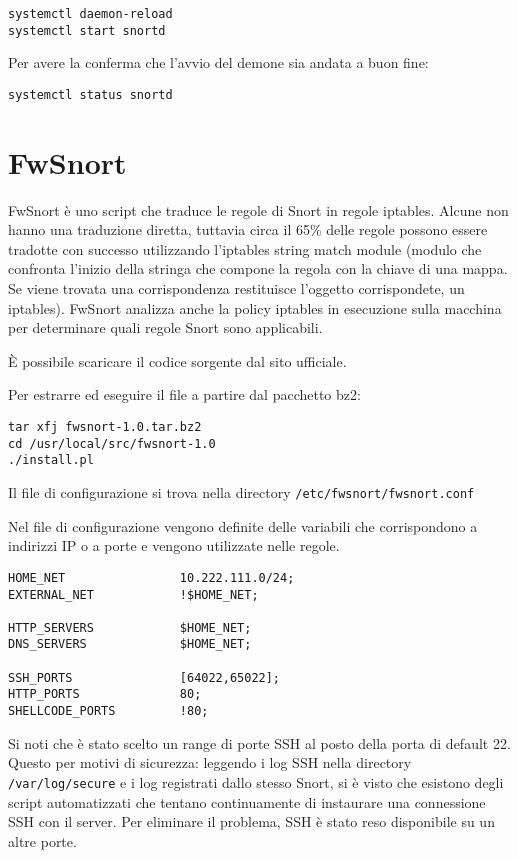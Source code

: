 \begin{verbatim}
systemctl daemon-reload
systemctl start snortd
\end{verbatim}

Per avere la conferma che l'avvio del demone sia andata a buon fine:

\begin{verbatim}
systemctl status snortd
\end{verbatim}

\section{FwSnort}

FwSnort è uno script che traduce le regole di Snort in regole iptables. Alcune non hanno una traduzione diretta, tuttavia circa il 65\% delle regole possono essere tradotte con successo utilizzando l'iptables string match module (modulo che confronta l'inizio della stringa che compone la regola con la chiave di una mappa. Se viene trovata una corrispondenza restituisce l'oggetto corrispondete, un iptables). FwSnort analizza anche la policy iptables in esecuzione sulla macchina per determinare quali regole Snort sono applicabili.

È possibile scaricare il codice sorgente dal sito ufficiale.

Per estrarre ed eseguire il file a partire dal pacchetto bz2:

\begin{verbatim}
tar xfj fwsnort-1.0.tar.bz2
cd /usr/local/src/fwsnort-1.0 
./install.pl
\end{verbatim}

Il file di configurazione si trova nella directory \texttt{/etc/fwsnort/fwsnort.conf}

Nel file di configurazione vengono definite delle variabili che corrispondono a indirizzi IP o a porte e vengono utilizzate nelle regole.

\begin{verbatim}
HOME_NET                10.222.111.0/24;
EXTERNAL_NET            !$HOME_NET;

HTTP_SERVERS            $HOME_NET;
DNS_SERVERS             $HOME_NET;

SSH_PORTS               [64022,65022];
HTTP_PORTS              80;
SHELLCODE_PORTS         !80;
\end{verbatim}

Si noti che è stato scelto un range di porte SSH al posto della porta di default 22. Questo per motivi di sicurezza: leggendo i log SSH nella directory \texttt{/var/log/secure} e i log registrati dallo stesso Snort, si è visto che esistono degli script automatizzati che tentano continuamente di instaurare una connessione SSH con il server. Per eliminare il problema, SSH è stato reso disponibile su un altre porte.

